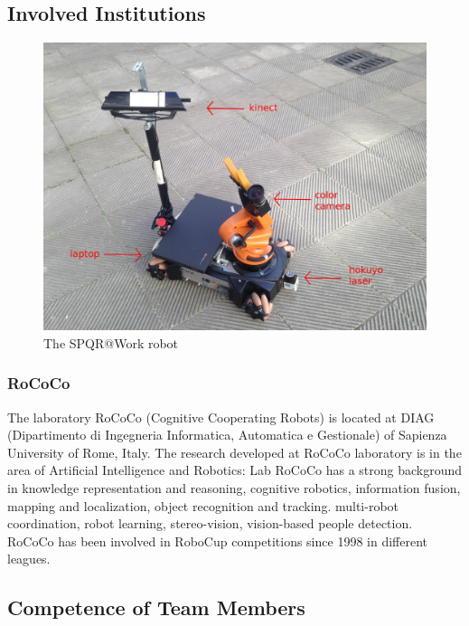 \documentclass[conference]{IEEEtran}
\begin{document}
\subsection{Involved Institutions}
\begin{figure}[t!]
\begin{center}
\includegraphics[width=\linewidth]{images/kuka.JPG}
\end{center}
\caption{The SPQR@Work robot}\label{fig:robot}
\end{figure}

\subsubsection{RoCoCo} The laboratory RoCoCo (Cognitive Cooperating Robots) is located at DIAG (Dipartimento di Ingegneria Informatica, Automatica e Gestionale) of Sapienza University of Rome, Italy.
The research developed at RoCoCo laboratory is in the area of Artificial Intelligence and Robotics: Lab RoCoCo has a strong background in knowledge representation and reasoning, cognitive robotics, information fusion, mapping and localization, object recognition and tracking. multi-robot coordination, robot learning, stereo-vision, vision-based people detection. RoCoCo has been involved in RoboCup competitions since 1998 in different leagues.\\

\subsection{Competence of Team Members}
\end{document}
